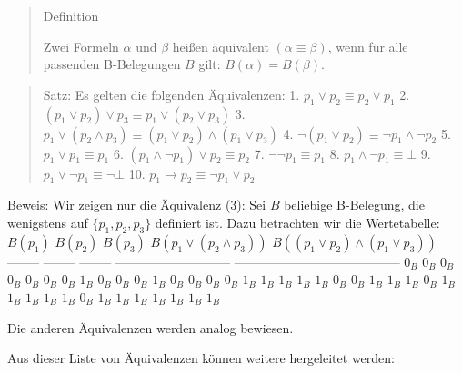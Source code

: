 \documentclass[a4paper]{article}
\begin{document}
\begin{multicols}{3}
  \begin{quote}
    Definition

    Zwei Formeln $\alpha$ und $\beta$ heißen äquivalent
    $(\alpha\equiv\beta)$, wenn für alle passenden B-Belegungen $B$ gilt:
    $B(\alpha) =B(\beta)$.
  \end{quote}

  \begin{quote}
    Satz: Es gelten die folgenden Äquivalenzen: 1.
    $p_1 \vee p_2 \equiv p_2 \vee p_1$ 2.
    $(p_1 \vee p_2 )\vee p_3 \equiv p_1 \vee (p_2 \vee p_3 )$ 3.
    $p_1 \vee (p_2 \wedge p_3 )\equiv (p_1 \vee p_2 )\wedge (p_1 \vee p_3 )$
    4. $\lnot(p_1 \vee p_2 )\equiv\lnot p_1 \wedge\lnot p_2$ 5.
    $p_1 \vee p_1 \equiv p_1$ 6.
    $(p_1 \wedge \lnot p_1 )\vee p_2 \equiv p_2$ 7.
    $\lnot\lnot p_1\equiv p_1$ 8. $p_1 \wedge\lnot p_1 \equiv\bot$ 9.
    $p_1 \vee\lnot p_1 \equiv\lnot\bot$ 10.
    $p_1 \rightarrow p_2 \equiv \lnot p_1 \vee p_2$
  \end{quote}

  Beweis: Wir zeigen nur die Äquivalenz (3): Sei $B$ beliebige B-Belegung,
  die wenigstens auf $\{p_1, p_2, p_3\}$ definiert ist. Dazu betrachten
  wir die Wertetabelle: \textbar{} $B(p_1)$ \textbar{} $B(p_2)$ \textbar{}
  $B(p_3)$ \textbar{} $B(p_1\vee(p_2\wedge p_3))$ \textbar{}
  $B((p_1\vee p_2)\wedge(p_1 \vee p_3 ))$ \textbar{} \textbar{} --------
  \textbar{} -------- \textbar{} -------- \textbar{}
  --------------------------- \textbar{}
  --------------------------------------- \textbar{} \textbar{} $0_B$
  \textbar{} $0_B$ \textbar{} $0_B$ \textbar{} $0_B$ \textbar{} $0_B$
  \textbar{} \textbar{} $0_B$ \textbar{} $0_B$ \textbar{} $1_B$ \textbar{}
  $0_B$ \textbar{} $0_B$ \textbar{} \textbar{} $0_B$ \textbar{} $1_B$
  \textbar{} $0_B$ \textbar{} $0_B$ \textbar{} $0_B$ \textbar{} \textbar{}
  $0_B$ \textbar{} $1_B$ \textbar{} $1_B$ \textbar{} $1_B$ \textbar{}
  $1_B$ \textbar{} \textbar{} $1_B$ \textbar{} $0_B$ \textbar{} $0_B$
  \textbar{} $1_B$ \textbar{} $1_B$ \textbar{} \textbar{} $1_B$ \textbar{}
  $0_B$ \textbar{} $1_B$ \textbar{} $1_B$ \textbar{} $1_B$ \textbar{}
  \textbar{} $1_B$ \textbar{} $1_B$ \textbar{} $0_B$ \textbar{} $1_B$
  \textbar{} $1_B$ \textbar{} \textbar{} $1_B$ \textbar{} $1_B$ \textbar{}
  $1_B$ \textbar{} $1_B$ \textbar{} $1_B$ \textbar{}

  Die anderen Äquivalenzen werden analog bewiesen.

  Aus dieser Liste von Äquivalenzen können weitere hergeleitet werden:


\end{multicols}
\end{document}
